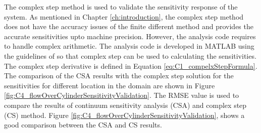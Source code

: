 The complex step method is used to validate the sensitivity response of the system. As mentioned in Chapter \ref{ch:introduction}, the complex step method does not have the accuracy issues of the finite different method and provides the accurate sensitivities upto machine precision. However, the analysis code requires to handle complex arithmetic. The analysis code is developed in MATLAB using the guidelines of \cite{martins2003complex} so that complex step can be used to calculating the sensitivities. The complex step derivative is defined in Equation \eqref{eq:C1_compelxStepFormula}. The comparison of the CSA results with the complex step solution for the sensitivities for different location in the domain are shown in Figure \ref{fig:C4_flowOverCylinderSensitivityValidation}. The RMSE value is used to compare the results of continuum sensitivity analysis (CSA) and complex step (CS) method. Figure \ref{fig:C4_flowOverCylinderSensitivityValidation}, shows a good comparison between the CSA and CS results.

